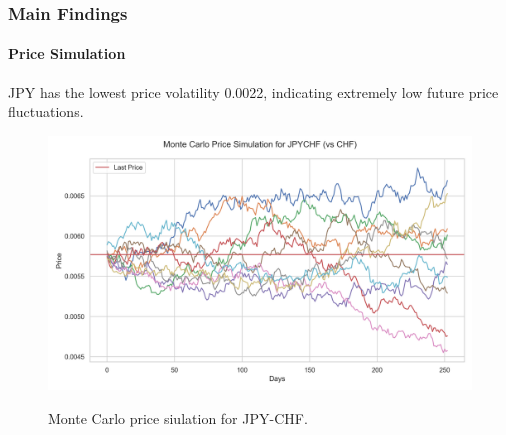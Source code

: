 \documentclass[10pt]{beamer}
\begin{document}
\begin{frame}
\frametitle{Main Findings}
\framesubtitle{Price Simulation}
JPY has the lowest price volatility 0.0022, indicating extremely low future price fluctuations. 

\begin{figure}
    \centering  \includegraphics[width=0.9\linewidth]{../../reports/figures/monte_carlo_price_simulation_JPYCHF_vs_CHF.png}  \label{fig:monte_carlo_price_simulation_JPYCHF_vs_CHF} 
    \caption{\footnotesize Monte Carlo price siulation for JPY-CHF.}
\end{figure}
\end{frame}
\end{document}
